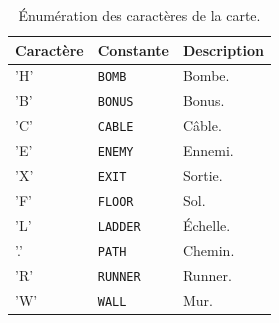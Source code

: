 \begin{table}[!htpb]
    \label{tab:enum-tile}
    \begin{tabularx}{\textwidth}{lXX}
        \toprule
        \textbf{Caractère} & \textbf{Constante} & \textbf{Description} \\
        \midrule
        'H' & \texttt{BOMB} & Bombe. \\
        'B' & \texttt{BONUS} & Bonus. \\
        'C' & \texttt{CABLE} & Câble. \\
        'E' & \texttt{ENEMY} & Ennemi. \\
        'X' & \texttt{EXIT} & Sortie. \\
        'F' & \texttt{FLOOR} & Sol. \\
        'L' & \texttt{LADDER} & Échelle. \\
        '.' & \texttt{PATH} & Chemin. \\
        'R' & \texttt{RUNNER} & Runner. \\
        'W' & \texttt{WALL} & Mur. \\
        \bottomrule
    \end{tabularx}
    \caption{Énumération des caractères de la carte.}
\end{table}